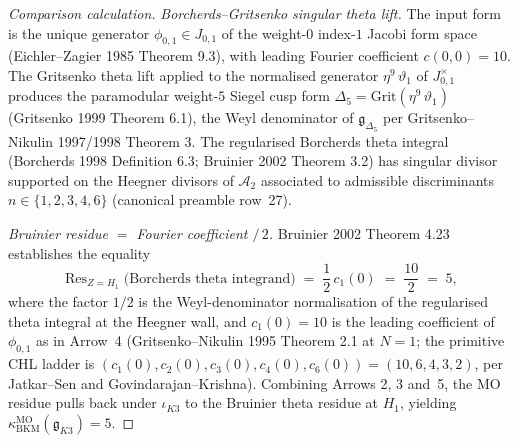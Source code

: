 \begin{proof}[Comparison calculation]
\emph{Borcherds--Gritsenko singular theta lift.} The input
form is the unique generator $\phi_{0, 1} \in J_{0, 1}$ of the
weight-$0$ index-$1$ Jacobi form space (Eichler--Zagier 1985
Theorem 9.3), with leading Fourier coefficient $c(0, 0) = 10$. The
Gritsenko theta lift applied to the normalised generator
$\eta^{9}\,\vartheta_{1}$ of $J_{0, 1}^{\times}$ produces the
paramodular weight-$5$ Siegel cusp form
$\Delta_{5} = \mathrm{Grit}(\eta^{9}\,\vartheta_{1})$
(Gritsenko 1999 Theorem 6.1), the Weyl denominator of
$\mathfrak{g}_{\Delta_{5}}$ per Gritsenko--Nikulin 1997/1998
Theorem 3. The regularised Borcherds theta integral
(Borcherds 1998 Definition 6.3; Bruinier 2002 Theorem 3.2) has
singular divisor supported on the Heegner divisors of
$\mathcal{A}_{2}$ associated to admissible discriminants
$n \in \{1, 2, 3, 4, 6\}$ (canonical preamble row~27).

\emph{Bruinier residue $=$ Fourier coefficient $/\,2$.}
Bruinier 2002 Theorem 4.23 establishes the equality
\[
 \mathop{\mathrm{Res}}_{Z = H_{1}}
 \bigl(\text{Borcherds theta integrand}\bigr)
 \;=\;
 \frac{1}{2}\, c_{1}(0)
 \;=\;
 \frac{10}{2}
 \;=\;
 5,
\]
where the factor $1/2$ is the Weyl-denominator normalisation of the
regularised theta integral at the Heegner wall, and
$c_{1}(0) = 10$ is the leading coefficient of $\phi_{0, 1}$ as in
Arrow~4 (Gritsenko--Nikulin 1995 Theorem 2.1 at $N = 1$; the primitive CHL ladder
is $(c_{1}(0), c_{2}(0), c_{3}(0), c_{4}(0), c_{6}(0)) = (10, 6, 4, 3, 2)$,
per Jatkar--Sen and Govindarajan--Krishna).
Combining Arrows 2, 3 and~5, the MO residue pulls back under \(\iota_{K3}\)
to the Bruinier theta residue at $H_{1}$, yielding
$\kappa_{\mathrm{BKM}}^{\mathrm{MO}}(\mathfrak{g}_{K3}) = 5$.
\end{proof}


